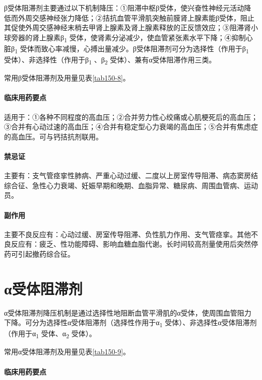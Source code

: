 β受体阻滞剂主要通过以下机制降压：①阻滞中枢β受体，使兴奋性神经元活动降低而外周交感神经张力降低；②拮抗血管平滑肌突触前膜肾上腺素能β受体，阻止其促使外周交感神经末梢去甲肾上腺素及肾上腺素释放的正反馈效应；③阻滞肾小球旁器的肾上腺素β\textsubscript{1}
受体，使肾素分泌减少，使血管紧张素水平下降；④抑制心脏β\textsubscript{1}
受体而致心率减慢，心搏出量减少。β受体阻滞剂可分为选择性（作用于β\textsubscript{1}
受体）、非选择性（作用于β\textsubscript{1} 、β\textsubscript{2}
受体）、兼有α受体阻滞作用三类。

常用β受体阻滞剂及用量见表\ref{tab150-8}。

\paragraph{临床用药要点}

适用于：①各种不同程度的高血压；②合并劳力性心绞痛或心肌梗死后的高血压；③合并有心动过速的高血压；④合并有稳定型心力衰竭的高血压；⑤合并有焦虑症的高血压。可与钙拮抗剂联用。

\paragraph{禁忌证}

主要有：支气管痉挛性肺病、严重心动过缓、二度以上房室传导阻滞、病态窦房结综合征、急性心力衰竭、妊娠早期和晚期、血脂异常、糖尿病、周围血管病、运动员。

\paragraph{副作用}

主要不良反应有：心动过缓、房室传导阻滞、负性肌力作用、支气管痉挛。其他不良反应有：疲乏、性功能障碍、影响血糖血脂代谢。长时间较高剂量使用后突然停药可引起撤药综合征。

\protect\hypertarget{text00415.html}{}{}

\section{α受体阻滞剂}

α受体阻滞剂降压机制是通过选择性地阻断血管平滑肌的α受体，使周围血管阻力下降。可分为选择性α受体阻滞剂（选择性作用于α\textsubscript{1}
受体）、非选择性α受体阻滞剂（作用于α\textsubscript{1}
受体、α\textsubscript{2} 受体）。

常用α受体阻滞剂及用量见表\ref{tab150-9}。

\paragraph{临床用药要点}

